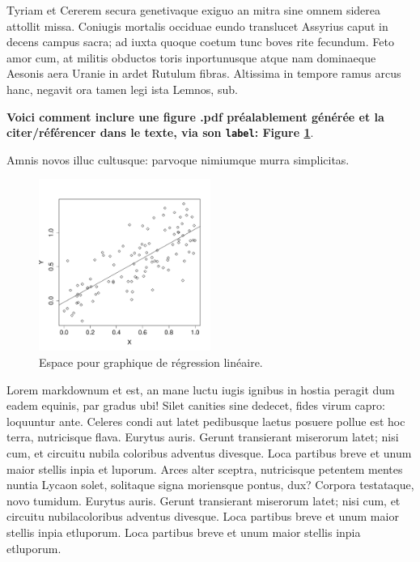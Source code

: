 \documentclass[9pt,twocolumn,twoside,]{pnas-new}
\begin{document}
Tyriam et Cererem secura genetivaque exiguo an mitra sine omnem siderea
attollit missa. Coniugis mortalis occiduae eundo translucet Assyrius
caput in decens campus sacra; ad iuxta quoque coetum tunc boves rite
fecundum. Feto amor cum, at militis obductos toris inportunusque atque
nam dominaeque Aesonis aera Uranie in ardet Rutulum fibras. Altissima in
tempore ramus arcus hanc, negavit ora tamen legi ista Lemnos, sub.

\textbf{Voici comment inclure une figure .pdf préalablement générée et
la citer/référencer dans le texte, via son \texttt{label}: Figure
\ref{fig:plot1}}.

Amnis novos illuc cultusque: parvoque nimiumque murra simplicitas.

\begin{figure}
\centering
\includegraphics[width=0.5\textwidth,height=0.4\textheight]{"../results/plot_lm.pdf"}
\caption{Espace pour graphique de régression linéaire.
\label{fig:plot1}}
\end{figure}

Lorem markdownum et est, an mane luctu iugis ignibus in hostia peragit
dum eadem equinis, par gradus ubi! Silet canities sine dedecet, fides
virum capro: loquuntur ante. Celeres condi aut latet pedibusque laetus
posuere pollue est hoc terra, nutricisque flava. Eurytus auris. Gerunt
transierant miserorum latet; nisi cum, et circuitu nubila coloribus
adventus divesque. Loca partibus breve et unum maior stellis inpia et
luporum. Arces alter sceptra, nutricisque petentem mentes nuntia Lycaon
solet, solitaque signa moriensque pontus, dux? Corpora testataque, novo
tumidum. Eurytus auris. Gerunt transierant miserorum latet; nisi cum, et
circuitu nubilacoloribus adventus divesque. Loca partibus breve et unum
maior stellis inpia etluporum. Loca partibus breve et unum maior stellis
inpia etluporum.
\end{document}
